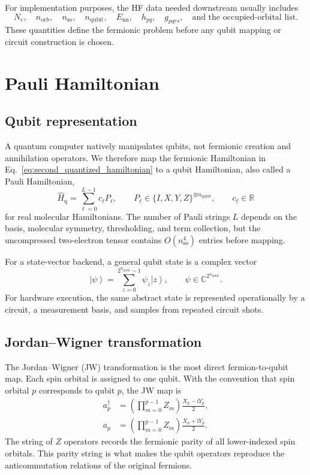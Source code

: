 \documentclass[11pt]{article}
\newcommand{\ii}{\mathrm{i}}
\newcommand{\ket}[1]{\left|#1\right\rangle}
\begin{document}
For implementation purposes, the HF data needed downstream usually includes
\begin{equation}
    N_e,\quad n_{\mathrm{orb}},\quad n_{\mathrm{so}},\quad n_{\mathrm{qubit}},\quad
    E_{\mathrm{nn}},\quad h_{pq},\quad g_{pqrs},\quad
    \text{and the occupied-orbital list.}
\end{equation}
These quantities define the fermionic problem before any qubit mapping or circuit construction is chosen.

\section{Pauli Hamiltonian}

\subsection{Qubit representation}

A quantum computer natively manipulates qubits, not fermionic creation and annihilation operators.  We therefore map the fermionic Hamiltonian in Eq.~\eqref{eq:second_quantized_hamiltonian} to a qubit Hamiltonian, also called a Pauli Hamiltonian,
\begin{equation}
    \hat{H}_{\mathrm{q}}
    = \sum_{\ell=0}^{L-1} c_\ell P_\ell,
    \qquad
    P_\ell\in\{I,X,Y,Z\}^{\otimes n_{\mathrm{qubit}}},
    \qquad c_\ell\in\mathbb{R}
    \label{eq:pauli_hamiltonian}
\end{equation}
for real molecular Hamiltonians.  The number of Pauli strings $L$ depends on the basis, molecular symmetry, thresholding, and term collection, but the uncompressed two-electron tensor contains $O(n_{\mathrm{so}}^4)$ entries before mapping.

For a state-vector backend, a general qubit state is a complex vector
\begin{equation}
    \ket{\psi}=\sum_{z=0}^{2^{n_{\mathrm{qubit}}}-1}\psi_z\ket{z},
    \qquad
    \psi\in\mathbb{C}^{2^{n_{\mathrm{qubit}}}}.
\end{equation}
For hardware execution, the same abstract state is represented operationally by a circuit, a measurement basis, and samples from repeated circuit shots.

\subsection{Jordan--Wigner transformation}

The Jordan--Wigner (JW) transformation is the most direct fermion-to-qubit map.  Each spin orbital is assigned to one qubit.  With the convention that spin orbital $p$ corresponds to qubit $p$, the JW map is
\begin{align}
    a_p^\dagger
    &= \left(\prod_{m=0}^{p-1} Z_m\right)\frac{X_p-\ii Y_p}{2}, \\
    a_p
    &= \left(\prod_{m=0}^{p-1} Z_m\right)\frac{X_p+\ii Y_p}{2}.
    \label{eq:jw_mapping}
\end{align}
The string of $Z$ operators records the fermionic parity of all lower-indexed spin orbitals.  This parity string is what makes the qubit operators reproduce the anticommutation relations of the original fermions.
\end{document}
